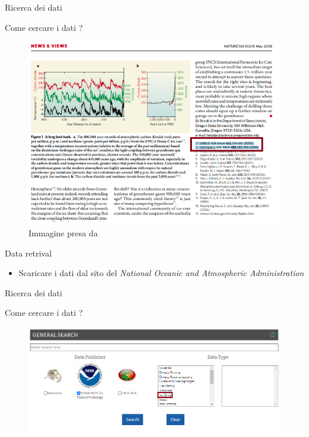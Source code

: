 \documentclass{beamer}
\begin{document}
\begin{frame}{Ricerca dei dati}
\begin{center}
Come cercare i dati ? 
\end{center}
\begin{figure}
\begin{center}
\includegraphics[width=\textwidth ]{Pic/Nature.png}
\caption{Immagine presa da \cite{overview}}
\end{center}
\end{figure}

\end{frame}




\begin{frame}{Data retrival}
\begin{itemize}
\item Scaricare i dati dal sito del \textit{National Oceanic and Atmospheric Administration} \href{https://www.ncei.noaa.gov/access/paleo-search/}{}
\end{itemize}
\end{frame}


\begin{frame}{Ricerca dei dati}
\begin{center}
Come cercare i dati ? 
\end{center}
\begin{figure}
\begin{center}
\includegraphics[width=\textwidth ]{Pic/NOAA_1.png}
\end{center}
\end{figure}
\end{frame}
\end{document}
